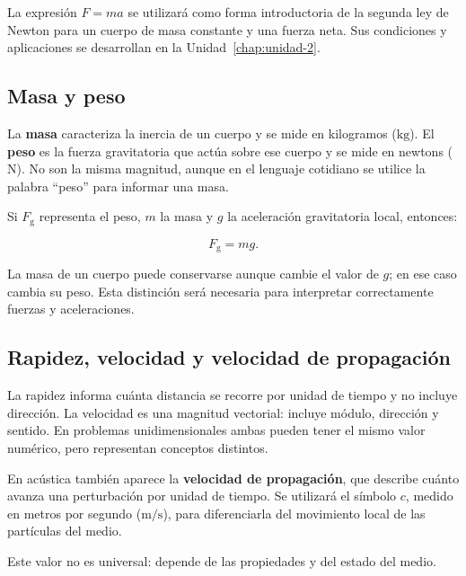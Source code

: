 La expresión \(F=ma\) se utilizará como forma introductoria de la segunda ley de Newton para un cuerpo de masa constante y una fuerza neta. Sus condiciones y aplicaciones se desarrollan en la Unidad~\ref{chap:unidad-2}.

\subsection{Masa y peso}
\label{sec:u1-masa-peso}

La \textbf{masa} caracteriza la inercia de un cuerpo y se mide en kilogramos (\(\text{kg}\)). El \textbf{peso} es la fuerza gravitatoria que actúa sobre ese cuerpo y se mide en newtons (\(\text{N}\)). No son la misma magnitud, aunque en el lenguaje cotidiano se utilice la palabra ``peso'' para informar una masa.

Si \(F_\mathrm{g}\) representa el peso, \(m\) la masa y \(g\) la aceleración gravitatoria local, entonces:

\begin{equation}
    F_\mathrm{g}=mg.
    \label{eq:u1-peso}
\end{equation}

La masa de un cuerpo puede conservarse aunque cambie el valor de \(g\); en ese caso cambia su peso. Esta distinción será necesaria para interpretar correctamente fuerzas y aceleraciones.

\subsection{Rapidez, velocidad y velocidad de propagación}
\label{sec:u1-velocidades}

La rapidez informa cuánta distancia se recorre por unidad de tiempo y no incluye dirección. La velocidad es una magnitud vectorial: incluye módulo, dirección y sentido. En problemas unidimensionales ambas pueden tener el mismo valor numérico, pero representan conceptos distintos.

En acústica también aparece la \textbf{velocidad de propagación}, que describe cuánto avanza una perturbación por unidad de tiempo. Se utilizará el símbolo \(c\), medido en metros por segundo (\(\text{m}/\text{s}\)), para diferenciarla del movimiento local de las partículas del medio.

 Este valor no es universal: depende de las propiedades y del estado del medio.

